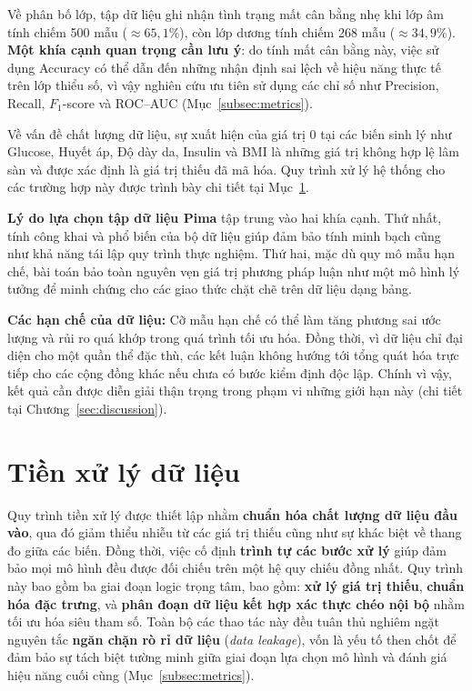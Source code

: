 \documentclass[14pt,a4paper]{extreport}
\begin{document}
Về phân bố lớp, tập dữ liệu ghi nhận tình trạng mất cân bằng nhẹ khi lớp âm tính chiếm 500 mẫu ($\approx 65,1\%$), còn lớp dương tính chiếm 268 mẫu ($\approx 34,9\%$). \textbf{Một khía cạnh quan trọng cần lưu ý}: do tính mất cân bằng này, việc sử dụng Accuracy có thể dẫn đến những nhận định sai lệch về hiệu năng thực tế trên lớp thiểu số, vì vậy nghiên cứu ưu tiên sử dụng các chỉ số như Precision, Recall, $F_1$-score và ROC--AUC (Mục~\ref{subsec:metrics}).

Về vấn đề chất lượng dữ liệu, sự xuất hiện của giá trị 0 tại các biến sinh lý như Glucose, Huyết áp, Độ dày da, Insulin và BMI là những giá trị không hợp lệ lâm sàn và được xác định là giá trị thiếu đã mã hóa. Quy trình xử lý hệ thống cho các trường hợp này được trình bày chi tiết tại Mục~\ref{subsec:preprocess}.

\textbf{Lý do lựa chọn tập dữ liệu Pima} tập trung vào hai khía cạnh. Thứ nhất, tính công khai và phổ biến của bộ dữ liệu giúp đảm bảo tính minh bạch cũng như khả năng tái lập quy trình thực nghiệm.\cite{uci-pima,pedregosa2011} Thứ hai, mặc dù quy mô mẫu hạn chế, bài toán bảo toàn nguyên vẹn giá trị phương pháp luận như một mô hình lý tưởng để minh chứng cho các giao thức chặt chẽ trên dữ liệu dạng bảng.

\textbf{Các hạn chế của dữ liệu:} Cỡ mẫu hạn chế có thể làm tăng phương sai ước lượng và rủi ro quá khớp trong quá trình tối ưu hóa. Đồng thời, vì dữ liệu chỉ đại diện cho một quần thể đặc thù, các kết luận không hướng tới tổng quát hóa trực tiếp cho các cộng đồng khác nếu chưa có bước kiểm định độc lập. Chính vì vậy, kết quả cần được diễn giải thận trọng trong phạm vi những giới hạn này (chi tiết tại Chương~\ref{sec:discussion}).\cite{uci-pima,smith1988}


\section{Tiền xử lý dữ liệu}
\label{subsec:preprocess}

Quy trình tiền xử lý được thiết lập nhằm \textbf{chuẩn hóa chất lượng dữ liệu đầu vào}, qua đó giảm thiểu nhiễu từ các giá trị thiếu cũng như sự khác biệt về thang đo giữa các biến. Đồng thời, việc cố định \textbf{trình tự các bước xử lý} giúp đảm bảo mọi mô hình đều được đối chiếu trên một hệ quy chiếu đồng nhất. Quy trình này bao gồm ba giai đoạn logic trọng tâm, bao gồm: \textbf{xử lý giá trị thiếu}, \textbf{chuẩn hóa đặc trưng}, và \textbf{phân đoạn dữ liệu kết hợp xác thực chéo nội bộ} nhằm tối ưu hóa siêu tham số. Toàn bộ các thao tác này đều tuân thủ nghiêm ngặt nguyên tắc \textbf{ngăn chặn rò rỉ dữ liệu} (\textit{data leakage}), vốn là yếu tố then chốt để đảm bảo sự tách biệt tường minh giữa giai đoạn lựa chọn mô hình và đánh giá hiệu năng cuối cùng (Mục~\ref{subsec:metrics}).\cite{pedregosa2011}
\end{document}

